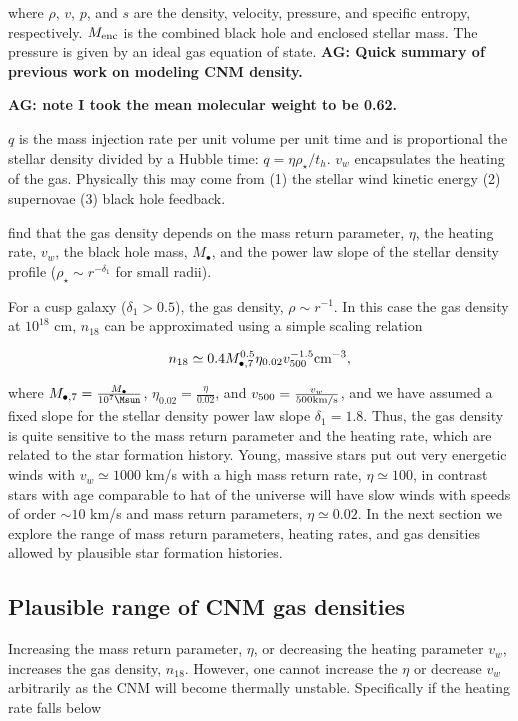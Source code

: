 \documentclass[usenatbib,fleqn]{mn2e}
\newcommand{\Mbh}[1][]{M_{\bullet#1}}
\newcommand{\Menc}{M_{\rm enc}}
\renewcommand{\th}{t_h}
\begin{document}
where $\rho$, $v$, $p$, and $s$ are the density, velocity, pressure, and
specific entropy, respectively.  $\Menc$ is the combined black hole
and enclosed stellar mass. The pressure is given by an ideal gas
equation of state.  {\bf AG: Quick summary of previous work on
  modeling CNM density.}

 {\bf AG: note I took the mean molecular weight to be
  0.62.}

$q$ is the mass injection rate per unit volume per unit time and is
proportional the stellar density divided by a Hubble time: $q=\eta
\rho_\star/\th$. $v_w$ encapsulates the heating of the gas. Physically
this may come from (1) the stellar wind kinetic energy (2) supernovae
(3) black hole feedback.

\citet{Generozov+2015} find that the gas density depends on the
mass return parameter, $\eta$, the heating rate, $v_w$, the black hole
mass, $\Mbh$, and the power law slope of the stellar density profile
($\rho_\star\sim r^{-\delta_1}$ for small radii).

For a cusp galaxy ($\delta_1> 0.5$), the gas density, $\rho\sim
r^{-1}$. In this case the gas density at $10^{18}$ cm, $n_{18}$ can be
approximated using a simple scaling relation 

\begin{equation}
n_{18}\simeq 0.4 \Mbh[,7]^{0.5} \eta_{0.02} v_{500}^{-1.5} {\rm
  cm^{-3}},
\label{eq:n18}
\end{equation}

where $\Mbh[,7]=\frac{\Mbh}{10^7 \Msun}$,
$\eta_{0.02}=\frac{\eta}{0.02}$, and $v_{500}=\frac{v_w}{500 {\rm
    km/s}}$, and we have assumed a fixed slope for the stellar density
power law slope $\delta_1=1.8$. Thus, the gas density is quite
sensitive to the mass return parameter and the heating rate, which are
related to the star formation history. Young, massive stars put out
very energetic winds with $v_w\simeq 1000$ km/s with a high mass
return rate, $\eta\simeq 100$, in contrast stars with age comparable
to hat of the universe will have slow winds with speeds of order $\sim
10$ km/s and mass return parameters, $\eta\simeq0.02$. In the next
section we explore the range of mass return parameters, heating rates,
and gas densities allowed by plausible star formation histories.

\subsection{Plausible range of CNM gas densities}
Increasing the mass return parameter, $\eta$, or decreasing the
heating parameter $v_w$, increases the gas density, $n_{18}$.
However, one cannot increase the $\eta$ or decrease $v_w$ arbitrarily
as the CNM will become thermally unstable. Specifically if the heating
rate falls below
\end{document}
